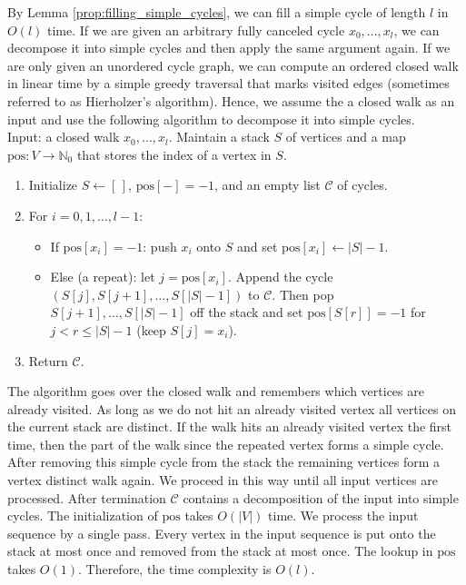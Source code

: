 \documentclass[a4paper,UKenglish,cleveref,nolineno,autoref]{socg-lipics-v2021}
\begin{document}
By Lemma \ref{prop:filling_simple_cycles}, we can fill a simple cycle of length $l$ in $O(l)$ time. If we are given an arbitrary fully canceled cycle $x_0,\ldots,x_l$, we can decompose it into simple cycles and then apply the same argument again. If we are only given an unordered cycle graph, we can compute an ordered closed walk in linear time by a simple greedy traversal that marks visited edges (sometimes referred to as Hierholzer's algorithm). Hence, we assume the a closed walk as an input and use the following algorithm to decompose it into simple cycles. \\

Input: a closed walk $x_0,\ldots,x_l$. Maintain a stack $S$ of vertices and a map $\text{pos}\colon V\rightarrow \mathbb{N}_0$ that stores
the index of a vertex in $S$.

\begin{enumerate}
\item Initialize $S\gets[\,]$, $\text{pos}[-]=-1$, and an empty list $\mathcal{C}$ of cycles.
\item For $i=0,1,\dots,l-1$:
  \begin{itemize}
  \item If $\text{pos}[x_i]=-1$: push $x_i$ onto $S$ and set $\text{pos}[x_i]\gets |S|-1$.
  \item Else (a repeat): let $j=\text{pos}[x_i]$. Append the cycle $(S[j], S[j{+}1], \dots, S[|S|-1])$ to $\mathcal{C}$. Then pop $S[j+1],\dots,S[|S|-1]$ off the stack and set $\text{pos}[S[r]]=-1$ for $j< r\leq\vert S\vert-1$ (keep $S[j]=x_i$).
  \end{itemize}
\item Return $\mathcal{C}$.
\end{enumerate}

The algorithm goes over the closed walk and remembers which vertices are already visited. As long as we do not hit an already visited vertex all vertices on the current stack are distinct. If the walk hits an already visited vertex the first time, then the part of the walk since the repeated vertex forms a simple cycle. After removing this simple cycle from the stack the remaining vertices form a vertex distinct walk again. We proceed in this way until all input vertices are processed. After termination $\mathcal{C}$ contains a decomposition of the input into simple cycles. The initialization of $\text{pos}$ takes $O(\vert V\vert)$ time. We process the input sequence by a single pass. Every vertex in the input sequence is put onto the stack at most once and removed from the stack at most once. The lookup in $\text{pos}$ takes $O(1)$. Therefore, the time complexity is $O(l)$.   
\end{document}
